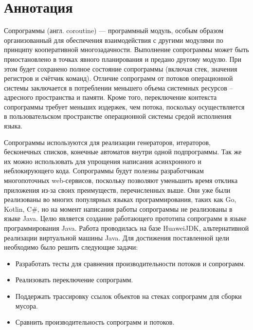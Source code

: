 \section{Аннотация}

Сопрограммы (англ. coroutine) — программный модуль, особым образом организованный для обеспечения взаимодействия с
другими модулями по принципу кооперативной многозадачности\cite{coroutine}. Выполнение сопрограммы может быть
приостановлено в точках явного планирования и предано другому модулю. 
При этом будет сохранено полное состояние сопрограммы (включая стек, значения регистров и счётчик команд). 
Отличие сопрограмм от потоков операционной системы заключается в потреблении меньшего объема системных ресурсов – адресного пространства и памяти. Кроме того, переключение контекста сопрограммы требует меньших издержек, чем потока,
поскольку осуществляется в пользовательском пространстве операционной системы средой исполнения языка. 
\par
Сопрограммы используются для реализации генераторов, итераторов, бесконечных списков, конечные автоматов внутри одной
подпрограммы. Так же их можно использовать для упрощения написания асинхронного и неблокирующего кода.
Сопрограммы будут полезны разработчикам многопоточных web-сервисов, поскольку позволяют уменьшить время отклика
приложения из-за своих преимуществ, перечисленных выше. 
Они уже были реализованы во многих популярных языках программирования, таких как Go, Kotlin, C\#, но на момент
написания работы сопрограммы не реализованы в языке Java.
Целю является создание работающего прототипа сопрограмм в языке программирования Java. Работа проводилась на базе
HuaweiJDK, альтернативной реализации виртуальной машины Java. Для достижения поставленной цели необходимо было решить следующие задачи:
\begin{itemize}
	\item Разработать тесты для сравнения производительности потоков и сопрограмм.
	\item Реализовать переключение сопрограмм.
	\item Поддержать трассировку ссылок объектов на стеках сопрограмм для сборки мусора. 
	\item Сравнить производительность сопрограмм и потоков.
\end{itemize}

\clearpage

